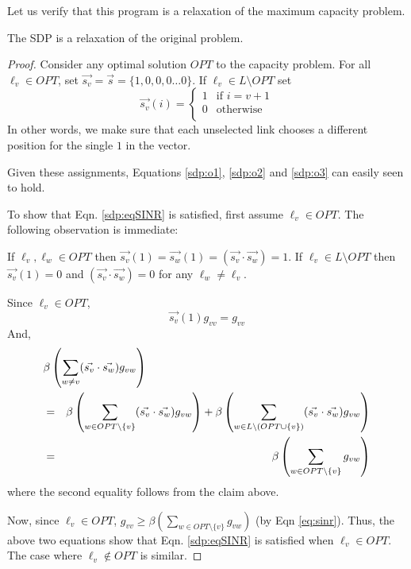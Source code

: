 \documentclass[11pt]{amsart}
\begin{document}
Let us verify that this program is a relaxation of the maximum capacity problem. 
\begin{lemma}
The SDP is a relaxation of the original problem.
\end{lemma}
\begin{proof}
Consider any optimal solution $OPT$ to the capacity problem.
For all $\ell_v \in OPT$, set $\vec{s_v} = \vec{s} =  \{1, 0, 0, 0 \ldots 0\}$. 
If $\ell_v \in L \setminus OPT$ 
set 
\begin{equation*} 
\vec{s_v}(i) = \left\{ 
\begin{array}{rl}
1 & \text{if } i = v + 1\\
0 & \text{otherwise}\\
\end{array} \right.
\end{equation*}
In other words, we make sure that each unselected link chooses a different position
for the single $1$ in the vector. 

Given these assignments, Equations \ref{sdp:o1}, \ref{sdp:o2} and \ref{sdp:o3} can easily seen to hold.

To show that Eqn. \ref{sdp:eqSINR} is satisfied, first assume $\ell_v \in OPT$. The following observation is immediate:
\begin{claim}
If $\ell_v, \ell_w \in OPT$ then $\vec{s_v}(1) = \vec{s_w}(1) = (\vec{s_v} \cdot \vec{s_w}) = 1$. If $\ell_v \in L \setminus OPT$
then $\vec{s_v}(1) =0$ and $(\vec{s_v} \cdot \vec{s_w}) = 0$ for any $\ell_w \neq \ell_v$.
\end{claim}

Since $\ell_v \in OPT$,
\begin{equation*}
\vec{s_v}(1) g_{vv} = g_{vv}
\end{equation*}
And,
\begin{eqnarray*}
\lefteqn{\beta\left(\sum_{w \neq v} (\vec{s_v} \cdot \vec{s_w}) g_{vw}\right) } \\
& = & \beta\left(\sum_{w \in OPT \setminus \{v\}} (\vec{s_v} \cdot \vec{s_w}) g_{vw}\right)  + \beta\left(\sum_{w \in L \setminus (OPT \cup \{v\})} (\vec{s_v} \cdot \vec{s_w}) g_{vw}\right) \\
& =&  \beta\left(\sum_{w \in OPT \setminus \{v\}} g_{vw} \right) 
\end{eqnarray*}
where the second equality follows from the claim above.

Now, since $\ell_v \in OPT$, $g_{vv} \geq \beta\left(\sum_{w \in OPT \setminus \{v\}} g_{vw}\right)$ (by Eqn \ref{eq:sinr}). Thus, the above two equations show that Eqn. \ref{sdp:eqSINR} is satisfied when $\ell_v \in OPT$. The
case where $\ell_v \not \in OPT$ is similar.


\end{proof}
\end{document}
